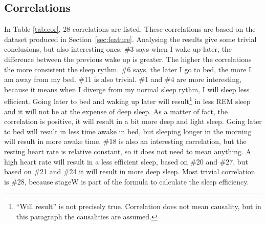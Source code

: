 	\subsection{Correlations}
	\label{sec:correlations}
	In Table \ref{tab:cor}, 28 correlations are listed. These correlations are based on the dataset produced in Section~\ref{sec:feature}. Analysing the results give some trivial conclusions, but also interesting ones. \#3 says when I wake up later, the difference between the previous wake up is greater. The higher the correlations the more consistent the sleep rythm. \#6 says, the later I go to bed, the more I am away from my bed. \#11 is also trivial. \#1 and \#4 are more interesting, because it means when I diverge from my normal sleep rythm, I will sleep less efficient. Going later to bed and waking up later will result\footnote{``Will result'' is not precisely true. Correlation does not mean causality, but in this paragraph the causalities are assumed.}  in less REM sleep and it will not be at the expense of deep sleep. As a matter of fact, the correlation is positive, it will result in a bit more deep and light sleep. Going later to bed will result in less time awake in bed, but sleeping longer in the morning will result in more awake time. \#18 is also an interesting correlation, but the resting heart rate is relative constant, so it does not need to mean anything. A high heart rate will result in a less efficient sleep, based on \#20 and \#27, but based on \#21 and \#24 it will result in more deep sleep. Most trivial correlation is \#28, because stageW is part of the formula to calculate the sleep efficiency.
		

